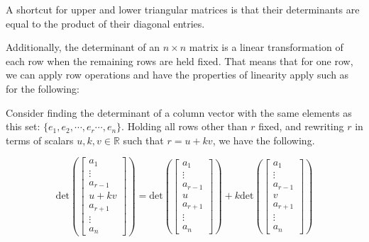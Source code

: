\documentclass[11pt]{article}
\begin{document}
A shortcut for upper and lower triangular matrices is that their determinants are equal to the product of their diagonal entries.

Additionally, the determinant of an $n\times n$ matrix is a linear transformation of each row when the remaining rows are held fixed. That means that for one row, we can apply row operations and have the properties of linearity apply such as for the following:

\newpage
Consider finding the determinant of a column vector with the same elements as this set: $\lbrace e_1,e_2,\cdots,e_r\cdots,e_n\rbrace$. Holding all rows other than $r$ fixed, and rewriting $r$ in terms of scalars $u,k,v\in\mathbb{R}$ such that $r=u+kv$, we have the following.

$$\text{det}\left(\begin{bmatrix}
a_1\\
\vdots\\
a_{r-1}\\
u+kv\\
a_{r+1}\\
\vdots\\
a_n
\end{bmatrix}\right)=
\text{det}\left(\begin{bmatrix}
a_1\\
\vdots\\
a_{r-1}\\
u\\
a_{r+1}\\
\vdots\\
a_n
\end{bmatrix}\right)+
k\text{det}\left(\begin{bmatrix}
a_1\\
\vdots\\
a_{r-1}\\
v\\
a_{r+1}\\
\vdots\\
a_n
\end{bmatrix}\right)
$$
\end{document}
